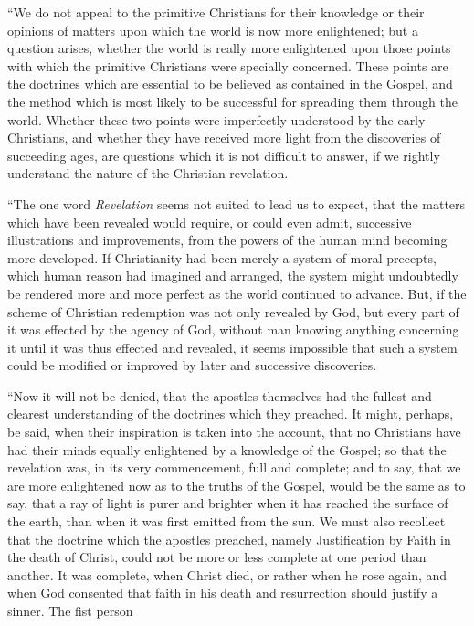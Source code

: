``We do
not appeal to the primitive Christians for their knowledge or their
opinions of matters upon which the world is now more enlightened; but a
question arises, whether the world is really more enlightened upon those
points with which the primitive Christians were specially concerned.
These points are the doctrines which are essential to be believed as
contained in the Gospel, and the method which is most likely to be
successful for spreading them through the world. Whether these two
points were imperfectly understood by the early Christians, and whether
they have received more light from the discoveries of succeeding ages,
are questions which it is not difficult to answer, if we rightly
understand the nature of the Christian revelation.

``The one
word \emph{Revelation} seems not suited to lead us to expect, that the
matters which have been revealed would require, or could even admit,
successive illustrations and improvements, from the powers of the human
mind becoming more developed. If Christianity had been merely a system
of moral precepts, which human reason had imagined and arranged, the
system might undoubtedly be rendered more and more perfect as the world
continued to advance. But, if the scheme of Christian redemption was not
only revealed by God, but every part of it was effected by the agency of
God, without man knowing anything concerning it until it was thus
effected and revealed, it seems impossible that such a system could be
modified or improved by later and successive discoveries.

``Now it
will not be denied, that the apostles themselves had the fullest and
clearest understanding of the doctrines which they preached. It might,
perhaps, be said, when their inspiration is taken into the account, that
no Christians have had their minds equally enlightened by a knowledge of
the Gospel; so that the revelation was, in its very commencement, full
and complete; and to say, that we are more enlightened now as to the
truths of the Gospel, would be the same as to say, that a ray of light
is purer and brighter when it has reached the surface of the earth, than
when it was first emitted from the sun. We must also recollect that the
doctrine which the apostles preached, namely Justification by Faith in
the death of Christ, could not be more or less complete at one period
than another. It was complete, when Christ died, or rather when he rose
again, and when God consented that faith in his death and resurrection
should justify a sinner. The fist person

